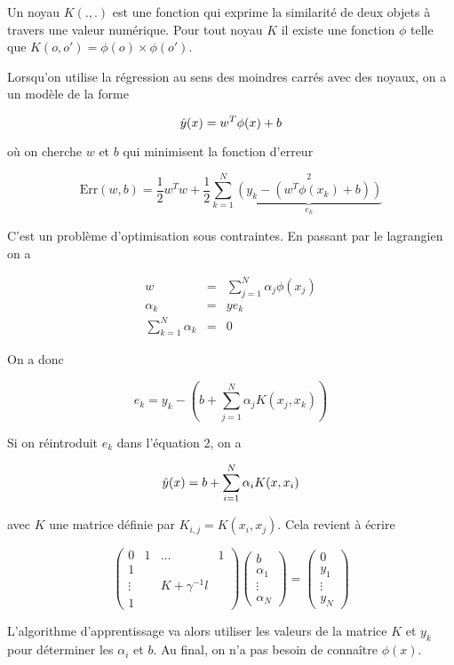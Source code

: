 Un noyau $K(., .)$ est une fonction qui exprime la similarité de deux objets à travers une valeur numérique. Pour tout noyau $K$ il existe une fonction $\phi$ telle que $K(o, o') = \phi(o) \times \phi(o')$.

Lorsqu'on utilise la régression au sens des moindres carrés avec des noyaux, on a un modèle de la forme

$$\hat{y}(x) = w^T \phi(x) + b$$

où on cherche $w$ et $b$ qui minimisent la fonction d'erreur

$$\text{Err}(w, b) = \frac{1}{2} w^T w + \frac{1}{2} \sum_{k = 1}^N \underbrace{(y_k - (w^T \phi(x_k) + b))}_{e_k}^2$$

C'est un problème d'optimisation sous contraintes. En passant par le lagrangien on a

\begin{eqnarray*}
w & = & \sum_{j = 1}^N \alpha_j \phi(x_j) \\
\alpha_k & = & y e_k \\
\sum_{k = 1}^N \alpha_k & = & 0
\end{eqnarray*}

On a donc

$$e_k = y_k - (b + \sum_{j = 1}^N \alpha_j K(x_j, x_k))$$

Si on réintroduit $e_k$ dans l'équation 2, on a

$$\hat{y}(x) = b + \sum_{i = 1}^N \alpha_i K(x, x_i)$$

avec $K$ une matrice définie par $K_{i, j} = K(x_i, x_j)$. Cela revient à écrire

$$\begin{pmatrix}
0 & 1 & \dots & 1 \\ 
1 &   &   &   \\ 
\vdots &   & K + \gamma^{-1}l &   \\ 
1 &   &   &  
\end{pmatrix} \begin{pmatrix}
b \\ 
\alpha_1 \\ 
\vdots \\ 
\alpha_N
\end{pmatrix} = \begin{pmatrix}
0 \\ 
y_1 \\ 
\vdots \\ 
y_N
\end{pmatrix} $$


L'algorithme d'apprentissage va alors utiliser les valeurs de la matrice $K$ et $y_k$ pour déterminer les $\alpha_i$ et $b$. Au final, on n'a pas besoin de connaître $\phi(x)$.

